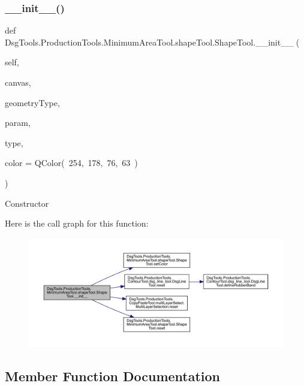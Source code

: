 \subsubsection{\texorpdfstring{\+\_\+\+\_\+init\+\_\+\+\_\+()}{\_\_init\_\_()}}
{\footnotesize\ttfamily def Dsg\+Tools.\+Production\+Tools.\+Minimum\+Area\+Tool.\+shape\+Tool.\+Shape\+Tool.\+\_\+\+\_\+init\+\_\+\+\_\+ (\begin{DoxyParamCaption}\item[{}]{self,  }\item[{}]{canvas,  }\item[{}]{geometry\+Type,  }\item[{}]{param,  }\item[{}]{type,  }\item[{}]{color = {\ttfamily QColor(~254,~178,~76,~63~)} }\end{DoxyParamCaption})}

\begin{DoxyVerb}Constructor
\end{DoxyVerb}
 Here is the call graph for this function\+:
\nopagebreak
\begin{figure}[H]
\begin{center}
\leavevmode
\includegraphics[width=350pt]{class_dsg_tools_1_1_production_tools_1_1_minimum_area_tool_1_1shape_tool_1_1_shape_tool_a0c6640cab6dc85dd2b103b6c69b4d8bd_cgraph}
\end{center}
\end{figure}


\subsection{Member Function Documentation}
\mbox{\label{class_dsg_tools_1_1_production_tools_1_1_minimum_area_tool_1_1shape_tool_1_1_shape_tool_ad604c8af734f0d61d8fe34203c7372b7}} 
